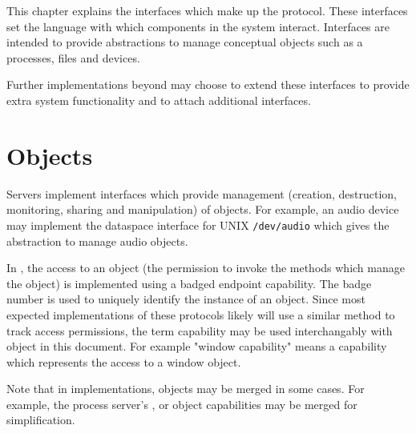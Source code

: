 %
%
%
%

This chapter explains the interfaces which make up the  protocol. These interfaces set the language with which components in the system interact. Interfaces are intended to provide abstractions to manage conceptual objects such as a processes, files and devices.

Further implementations beyond  may choose to extend these interfaces to provide extra system functionality and to attach additional interfaces.

\section{Objects}

Servers implement interfaces which provide management (creation, destruction, monitoring, sharing and manipulation) of objects. For example, an audio device may implement the dataspace interface for UNIX \texttt{/dev/audio} which gives the abstraction to manage audio objects.

In , the access to an object (the permission to invoke the methods which manage the object) is implemented using a badged endpoint capability. The badge number is used to uniquely identify the instance of an object. Since most expected implementations of these protocols likely will use a similar method to track access permissions, the term capability may be used interchangably with object in this document. For example "window capability" means a capability which represents the access to a window object.

Note that in implementations, objects may be merged in some cases. For example, the process server's ,  or  object capabilities may be merged for simplification.

